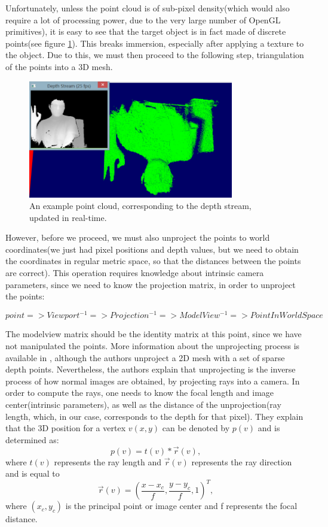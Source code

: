 \documentclass[]{article}
\begin{document}
Unfortunately, unless the point cloud is of sub-pixel density(which would also require a lot of processing power, due to the very large number of OpenGL primitives), it is easy to see that the target object is in fact made of discrete points(see figure \ref{fig:PointCloud}). This breaks immersion, especially after applying a texture to the object. Due to this, we must then proceed to the following step, triangulation of the points into a 3D mesh.

\begin{figure}[hbtp]
    \centering
    \includegraphics[width=0.8\textwidth]{figures/PointCloud.PNG}
    \caption{An example point cloud, corresponding to the depth stream, updated in real-time.}
    \label{fig:PointCloud}
\end{figure}

 However, before we proceed, we must also unproject the points to world coordinates(we just had pixel positions and depth values, but we need to obtain the coordinates in regular metric space, so that the distances between the points are correct). This operation requires knowledge about intrinsic camera parameters, since we need to know the projection matrix, in order to unproject the points:

$$point => Viewport^{-1} => Projection^{-1} => ModelView^{-1} => PointInWorldSpace$$

The modelview matrix should be the identity matrix at this point, since we have not manipulated the points.
More information about the unprojecting process is available in \cite{sung2013}, although the authors unproject a 2D mesh with a set of sparse depth points. Nevertheless, the authors explain that unprojecting is the inverse process of how normal images are obtained, by projecting rays into a camera. In order to compute the rays, one needs to know the focal length and image center(intrinsic parameters), as well as the distance of the unprojection(ray length, which, in our case, corresponds to the depth for that pixel). They explain that the 3D position for a vertex $v(x,y)$ can be denoted by $p(v)$ and is determined as:
$$p(v) = t(v) *\vec{r}(v),$$
where $t(v)$ represents the ray length and $\vec{r}(v)$ represents the ray direction and is equal to $$\vec{r}(v) = (\frac{x - x_{c}}{f},\frac{y-y_{c}}{f},1)^T,$$ where $(x_{c}, y_{c})$ is the principal point or image center and f represents the focal distance.
\end{document}
